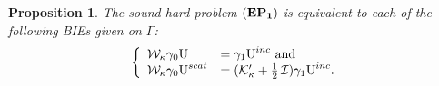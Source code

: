 \documentclass[1pt]{article}
\newcommand{\be}{\begin{equation}}
\newcommand{\ee}{\end{equation}}
\newcommand{\mK}{\mathcal{K}}
\newcommand{\mI}{\nobreak\hspace{.16667em plus .08333em}\mathcal{I}}
\newcommand{\U}{{\text{U}}}
\newtheorem{proposition}{Proposition}
\begin{document}
\begin{proposition}
The \emph{sound-hard} problem ${\bf (EP_1)}$ is equivalent to each of the following BIEs given on $\Gamma$:
\be
\left\{
\label{eq:B_EP_0}
\begin{array}{ll}
\mathcal{W}_\kappa \gamma_0 \U &= \gamma_1 \U^{inc}\text{ and }\\
\mathcal{W}_\kappa \gamma_0 \U^{scat} &= (\mK'_\kappa+\frac{1}{2}\mI) \gamma_1 \U^{inc}.
\end{array}
\right.
\ee
\end{proposition}
\end{document}
